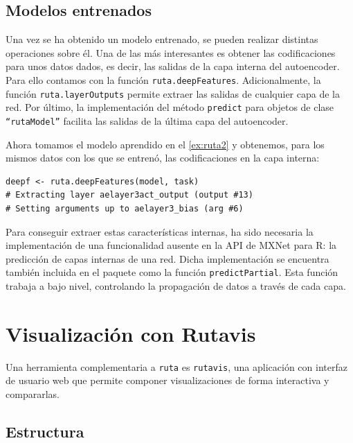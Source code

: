 \subsection{Modelos entrenados}

Una vez se ha obtenido  un modelo entrenado, se pueden realizar distintas operaciones sobre él. Una de las más interesantes es obtener las codificaciones para unos datos dados, es decir, las salidas de la capa interna del autoencoder. Para ello contamos con la función \texttt{ruta.deepFeatures}. Adicionalmente, la función \texttt{ruta.layerOutputs} permite extraer las salidas de cualquier capa de la red. Por último, la implementación del método \texttt{predict} para objetos de clase \texttt{``rutaModel''} facilita las salidas de la última capa del autoencoder.

\begin{example}
Ahora tomamos el modelo aprendido en el \autoref{ex:ruta2} y obtenemos, para los mismos datos con los que se entrenó, las codificaciones en la capa interna:
  \begin{lstlisting}
deepf <- ruta.deepFeatures(model, task)
# Extracting layer aelayer3act_output (output #13)
# Setting arguments up to aelayer3_bias (arg #6)
  \end{lstlisting}
\end{example}

Para conseguir extraer estas características internas, ha sido necesaria la implementación de una funcionalidad ausente en la API de MXNet para R: la predicción de capas internas de una red. Dicha implementación se encuentra también incluida en el paquete como la función \texttt{predictPartial}. Esta función trabaja a bajo nivel, controlando la propagación de datos a través de cada capa.

\section{Visualización con Rutavis}\label{sec:rutavis}

Una herramienta complementaria a \texttt{ruta} es \texttt{rutavis}, una
aplicación con interfaz de usuario web que permite componer
visualizaciones de forma interactiva y compararlas.

\subsection{Estructura}


